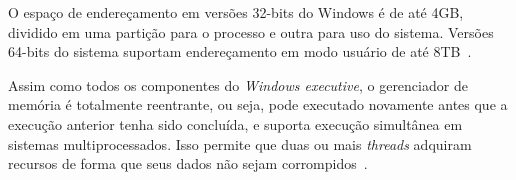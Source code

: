 	O espaço de endereçamento em versões 32-bits do Windows é de até 4GB, dividido em uma partição para o processo e outra para uso do sistema. Versões 64-bits do sistema suportam endereçamento em modo usuário de até 8TB~\cite{w10_memory}.
	
	Assim como todos os componentes do \emph{Windows executive}, o gerenciador de memória é totalmente reentrante, ou seja, pode executado novamente antes que a execução anterior tenha sido concluída, e suporta execução simultânea em sistemas multiprocessados. Isso permite que duas ou mais \emph{threads} adquiram recursos de forma que seus dados não sejam corrompidos~\cite{internals_pt1}.